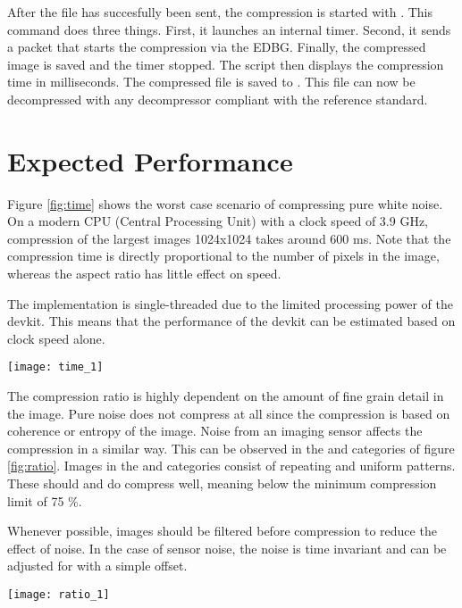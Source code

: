 \documentclass[12pt, a4paper]{article}
\begin{document}
\medskip
\noindent
After the file has succesfully been sent, the compression is started with . 
This command does three things. 
First, it launches an internal timer. 
Second, it sends a packet that starts the compression via the EDBG. 
Finally, the compressed image is saved and the timer stopped. 
The script then displays the compression time in milliseconds. 
The compressed file is saved to . 
This file can now be decompressed with any decompressor compliant with the reference standard.

\newpage
\section{Expected Performance}
Figure \ref{fig:time} shows the worst case scenario of compressing pure white noise.
On a modern CPU (Central Processing Unit) with a clock speed of 3.9 GHz, 
compression of the largest images 1024x1024 takes around 600 ms. 
Note that the compression time is directly proportional to the number of pixels in the image, 
whereas the aspect ratio has little effect on speed.

\medskip
\noindent
The implementation is single-threaded due to the limited processing power of the devkit. 
This means that the performance of the devkit can be estimated based on clock speed alone.

\begin{minipage}{\textwidth}
\centering
\medskip
\texttt{[image: time\_1]}
\label{fig:time}
\bigskip
\end{minipage}

\newpage
\noindent
The compression ratio is highly dependent on the amount of fine grain detail in the image. 
Pure noise does not compress at all since the compression is based on coherence or entropy of the image. 
Noise from an imaging sensor affects the compression in a similar way. 
This can be observed in the  and  categories of figure \ref{fig:ratio}. 
Images in the  and  categories consist of repeating and uniform patterns. 
These should and do compress well, meaning below the minimum compression limit of 75 \%.

\medskip
\noindent Whenever possible, images should be filtered before compression to reduce the effect of noise. 
In the case of sensor noise, the noise is time invariant and can be adjusted for with a simple offset.

\begin{minipage}{\textwidth}
\centering
\medskip
\texttt{[image: ratio\_1]}
\label{fig:ratio}
\bigskip
\end{minipage}
\end{document}
